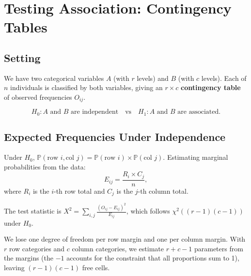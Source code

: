 \documentclass[12pt, a4paper, oneside]{book}
\theoremstyle{definition}
\theoremstyle{plain}
\theoremstyle{remark}
\newcommand{\Prob}{\mathbb{P}}
\begin{document}
\section{Testing Association: Contingency Tables}
\label{sec:contingency}

\subsection{Setting}

We have two categorical variables $A$ (with $r$ levels) and $B$ (with $c$
levels).  Each of $n$ individuals is classified by both variables, giving an
$r\times c$ \textbf{contingency table} of observed frequencies $O_{ij}$.

\[
  H_0: A \text{ and } B \text{ are independent}
  \quad\text{vs}\quad
  H_1: A \text{ and } B \text{ are associated.}
\]

\subsection{Expected Frequencies Under Independence}

Under $H_0$, $\Prob(\text{row }i, \text{col }j) = \Prob(\text{row }i)\times\Prob(\text{col }j)$.
Estimating marginal probabilities from the data:
\[
  E_{ij} = \frac{R_i \times C_j}{n},
\]
where $R_i$ is the $i$-th row total and $C_j$ is the $j$-th column total.

The test statistic is $X^2 = \sum_{i,j}\frac{(O_{ij}-E_{ij})^2}{E_{ij}}$,
which follows $\chi^2((r-1)(c-1))$ under $H_0$.

\begin{intuition}
We lose one degree of freedom per row margin and one per column margin.
With $r$ row categories and $c$ column categories, we estimate $r+c-1$
parameters from the margins (the $-1$ accounts for the constraint that all
proportions sum to 1), leaving $(r-1)(c-1)$ free cells.
\end{intuition}
\end{document}
